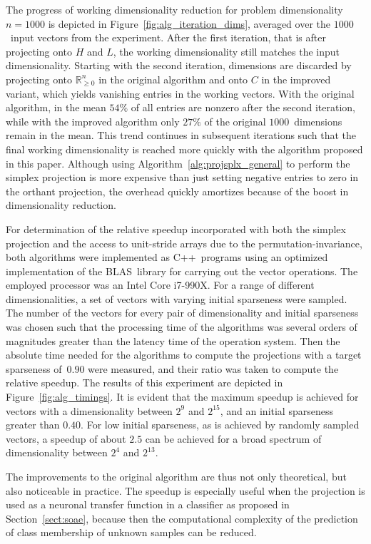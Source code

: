\documentclass[twoside,11pt]{article}
\newcommand{\R}{\mathbb{R}}
\newcommand{\0}{\mathcal{O}}
\begin{document}
The progress of working dimensionality reduction for problem dimensionality $n = 1000$ is depicted in Figure~\ref{fig:alg_iteration_dims}, averaged over the $1000$~input vectors from the experiment.
After the first iteration, that is after projecting onto $H$ and $L$, the working dimensionality still matches the input dimensionality.
Starting with the second iteration, dimensions are discarded by projecting onto $\R_{\geq 0}^n$ in the original algorithm and onto $C$ in the improved variant, which yields vanishing entries in the working vectors.
With the original algorithm, in the mean $54\%$ of all entries are nonzero after the second iteration, while with the improved algorithm only $27\%$ of the original $1000$~dimensions remain in the mean.
This trend continues in subsequent iterations such that the final working dimensionality is reached more quickly with the algorithm proposed in this paper.
Although using Algorithm~\ref{alg:projsplx_general} to perform the simplex projection is more expensive than just setting negative entries to zero in the orthant projection, the overhead quickly amortizes because of the boost in dimensionality reduction.

For determination of the relative speedup incorporated with both the simplex projection and the access to unit-stride arrays due to the permutation-invariance, both algorithms were implemented as C++~programs using an optimized implementation of the BLAS~library for carrying out the vector operations.
The employed processor was an Intel Core i7-990X.
For a range of different dimensionalities, a set of vectors with varying initial sparseness were sampled.
The number of the vectors for every pair of dimensionality and initial sparseness was chosen such that the processing time of the algorithms was several orders of magnitudes greater than the latency time of the operation system.
Then the absolute time needed for the algorithms to compute the projections with a target sparseness of~$0.90$ were measured, and their ratio was taken to compute the relative speedup.
The results of this experiment are depicted in Figure~\ref{fig:alg_timings}.
It is evident that the maximum speedup is achieved for vectors with a dimensionality between $2^9$ and $2^{15}$, and an initial sparseness greater than $0.40$.
For low initial sparseness, as is achieved by randomly sampled vectors, a speedup of about $2.5$ can be achieved for a broad spectrum of dimensionality between $2^4$ and $2^{13}$.

The improvements to the original algorithm are thus not only theoretical, but also noticeable in practice.
The speedup is especially useful when the projection is used as a neuronal transfer function in a classifier as proposed in Section~\ref{sect:soae}, because then the computational complexity of the prediction of class membership of unknown samples can be reduced.
\end{document}
